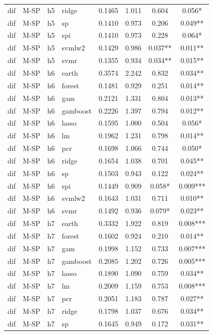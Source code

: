 \begin{ThreePartTable}
\begin{longtable}[t]{llclcccc}
dif & M-SP & h5 & ridge & 0.1465 & 1.011 & 0.604 & 0.056*\\
dif & M-SP & h5 & sp & 0.1410 & 0.973 & 0.206 & 0.049**\\
dif & M-SP & h5 & spi & 0.1410 & 0.973 & 0.228 & 0.064*\\
dif & M-SP & h5 & svmlw2 & 0.1429 & 0.986 & 0.037** & 0.011**\\
dif & M-SP & h5 & svmr & 0.1355 & 0.934 & 0.034** & 0.015**\\
\addlinespace
dif & M-SP & h6 & earth & 0.3574 & 2.242 & 0.832 & 0.034**\\
dif & M-SP & h6 & forest & 0.1481 & 0.929 & 0.251 & 0.014**\\
dif & M-SP & h6 & gam & 0.2121 & 1.331 & 0.804 & 0.013**\\
dif & M-SP & h6 & gamboost & 0.2226 & 1.397 & 0.794 & 0.012**\\
dif & M-SP & h6 & lasso & 0.1595 & 1.000 & 0.504 & 0.056*\\
dif & M-SP & h6 & lm & 0.1962 & 1.231 & 0.798 & 0.014**\\
dif & M-SP & h6 & pcr & 0.1698 & 1.066 & 0.744 & 0.050*\\
dif & M-SP & h6 & ridge & 0.1654 & 1.038 & 0.701 & 0.045**\\
dif & M-SP & h6 & sp & 0.1503 & 0.943 & 0.122 & 0.024**\\
dif & M-SP & h6 & spi & 0.1449 & 0.909 & 0.058* & 0.009***\\
dif & M-SP & h6 & svmlw2 & 0.1643 & 1.031 & 0.711 & 0.010**\\
dif & M-SP & h6 & svmr & 0.1492 & 0.936 & 0.079* & 0.023**\\
\addlinespace
dif & M-SP & h7 & earth & 0.3332 & 1.922 & 0.819 & 0.008***\\
dif & M-SP & h7 & forest & 0.1602 & 0.924 & 0.210 & 0.014**\\
dif & M-SP & h7 & gam & 0.1998 & 1.152 & 0.733 & 0.007***\\
dif & M-SP & h7 & gamboost & 0.2085 & 1.202 & 0.726 & 0.005***\\
dif & M-SP & h7 & lasso & 0.1890 & 1.090 & 0.759 & 0.034**\\
dif & M-SP & h7 & lm & 0.2009 & 1.159 & 0.753 & 0.008***\\
dif & M-SP & h7 & pcr & 0.2051 & 1.183 & 0.787 & 0.027**\\
dif & M-SP & h7 & ridge & 0.1798 & 1.037 & 0.676 & 0.034**\\
dif & M-SP & h7 & sp & 0.1645 & 0.949 & 0.172 & 0.031**\\

\end{longtable}
\end{ThreePartTable}
